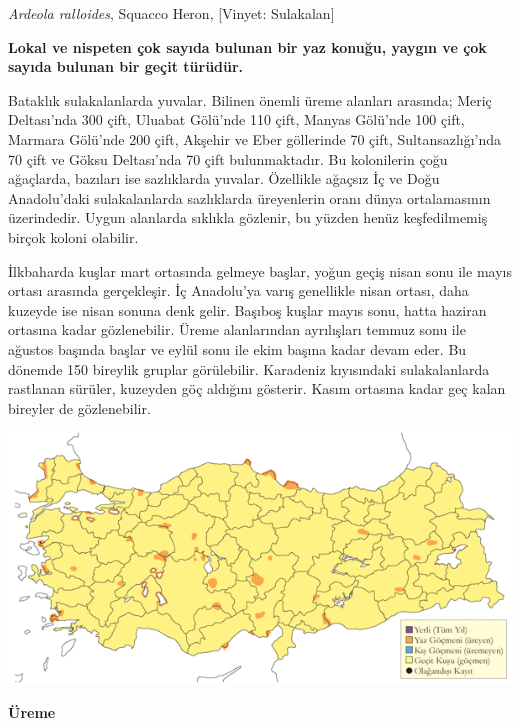 \documentclass[
  a4paper,
  DIV=11,
  numbers=noendperiod]{scrreprt}
\begin{document}
\emph{Ardeola ralloides}, Squacco Heron, {[}Vinyet: Sulakalan{]}

\textbf{Lokal ve nispeten çok sayıda bulunan bir yaz konuğu, yaygın ve
çok sayıda bulunan bir geçit türüdür.}

Bataklık sulakalanlarda yuvalar. Bilinen önemli üreme alanları arasında;
Meriç Deltası'nda 300 çift, Uluabat Gölü'nde 110 çift, Manyas Gölü'nde
100 çift, Marmara Gölü'nde 200 çift, Akşehir ve Eber göllerinde 70 çift,
Sultansazlığı'nda 70 çift ve Göksu Deltası'nda 70 çift bulunmaktadır. Bu
kolonilerin çoğu ağaçlarda, bazıları ise sazlıklarda yuvalar. Özellikle
ağaçsız İç ve Doğu Anadolu'daki sulakalanlarda sazlıklarda üreyenlerin
oranı dünya ortalamasının üzerindedir. Uygun alanlarda sıklıkla
gözlenir, bu yüzden henüz keşfedilmemiş birçok koloni olabilir.

İlkbaharda kuşlar mart ortasında gelmeye başlar, yoğun geçiş nisan sonu
ile mayıs ortası arasında gerçekleşir. İç Anadolu'ya varış genellikle
nisan ortası, daha kuzeyde ise nisan sonuna denk gelir. Başıboş kuşlar
mayıs sonu, hatta haziran ortasına kadar gözlenebilir. Üreme
alanlarından ayrılışları temmuz sonu ile ağustos başında başlar ve eylül
sonu ile ekim başına kadar devam eder. Bu dönemde 150 bireylik gruplar
görülebilir. Karadeniz kıyısındaki sulakalanlarda rastlanan sürüler,
kuzeyden göç aldığını gösterir. Kasım ortasına kadar geç kalan bireyler
de gözlenebilir.

\includegraphics{images/harita_Page_067.png}

\textbf{Üreme}
\end{document}
